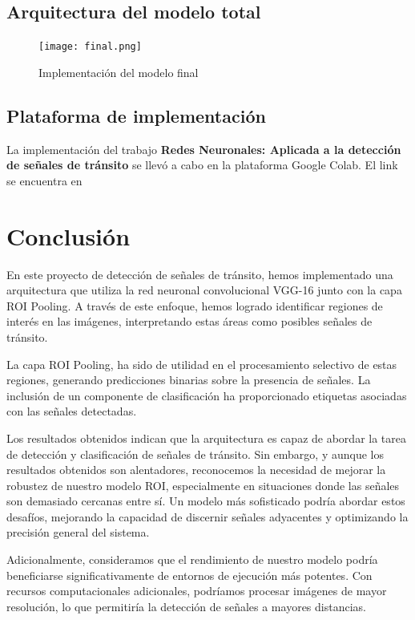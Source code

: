     \subsection{Arquitectura del modelo total}

    \begin{figure}[ht]
	    \centering
		\texttt{[image: final.png]}
		\caption{Implementación del modelo final}
	\end{figure}

 \vspace{0.5cm}

 \subsection{Plataforma de implementación}
 La implementación del trabajo \textbf{Redes Neuronales: Aplicada a la detección de señales de tránsito} se llevó a cabo en la plataforma Google Colab. El link se encuentra en \cite{colab}

\newpage
\section{Conclusión}
En este proyecto de detección de señales de tránsito, hemos implementado una arquitectura que utiliza la red neuronal convolucional VGG-16 junto con la capa ROI Pooling. A través de este enfoque, hemos logrado identificar regiones de interés en las imágenes, interpretando estas áreas como posibles señales de tránsito.

La capa ROI Pooling, ha sido de utilidad en el procesamiento selectivo de estas regiones, generando predicciones binarias sobre la presencia de señales. La inclusión de un componente de clasificación ha proporcionado etiquetas asociadas con las señales detectadas.

Los resultados obtenidos indican que la arquitectura es capaz de abordar la tarea de detección y clasificación de señales de tránsito. Sin embargo, y aunque los resultados obtenidos son alentadores, reconocemos la necesidad de mejorar la robustez de nuestro modelo ROI, especialmente en situaciones donde las señales son demasiado cercanas entre sí. Un modelo más sofisticado podría abordar estos desafíos, mejorando la capacidad de discernir señales adyacentes y optimizando la precisión general del sistema.

Adicionalmente, consideramos que el rendimiento de nuestro modelo podría beneficiarse significativamente de entornos de ejecución más potentes. Con recursos computacionales adicionales, podríamos procesar imágenes de mayor resolución, lo que permitiría la detección de señales a mayores distancias.

